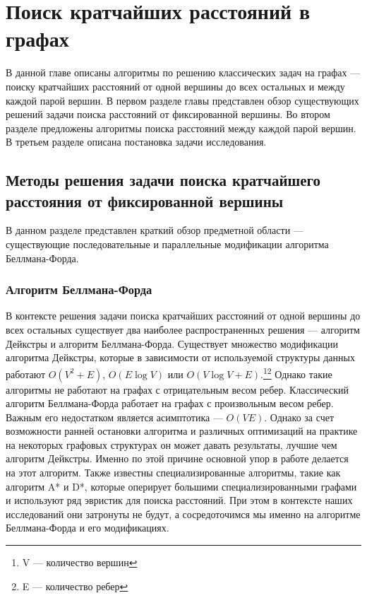 \chapter{Поиск кратчайших расстояний в графах}
\label{chapSVD}

В данной главе описаны алгоритмы по решению классических задач на графах --- поиску кратчайших расстояний от одной вершины до всех остальных и между каждой парой вершин. В первом разделе главы представлен обзор существующих решений задачи поиска расстояний от фиксированной вершины. Во втором разделе предложены алгоритмы поиска расстояний между каждой парой вершин. В третьем разделе описана постановка задачи исследования.

\FloatBarrier
\section{Методы решения задачи поиска кратчайшего расстояния от фиксированной вершины}

В данном разделе представлен краткий обзор предметной области --- существующие последовательные и параллельные модификации алгоритма Беллмана-Форда.

\FloatBarrier
\subsection{Алгоритм Беллмана-Форда}

В контексте решения задачи поиска кратчайших расстояний от одной вершины до всех остальных существует два наиболее распространенных решения --- алгоритм Дейкстры и алгоритм Беллмана-Форда. Существует множество модификации алгоритма Дейкстры, которые в зависимости от используемой структуры данных работают $O(V^2+E)$, $O(E \log V)$ или $O(V \log V+E)$.\footnote{V --- количество вершин}\footnote{E --- количество ребер} Однако такие алгоритмы не работают на графах с отрицательным весом ребер. Классический алгоритм Беллмана-Форда работает на графах с произвольным весом ребер. Важным его недостатком является асимптотика --- $O(VE)$. Однако за счет возможности ранней остановки алгоритма и различных оптимизаций на практике на некоторых графовых структурах он может давать результаты, лучшие чем алгоритм Дейкстры. Именно по этой причине основной упор в работе делается на этот алгоритм. Также известны специализированные алгоритмы, такие как алгоритм A* и D*, которые оперирует большими специализированными графами и используют ряд эвристик для поиска расстояний. При этом в контексте наших исследований они затронуты не будут, а сосредоточимся мы именно на алгоритме Беллмана-Форда и его модификациях.   

